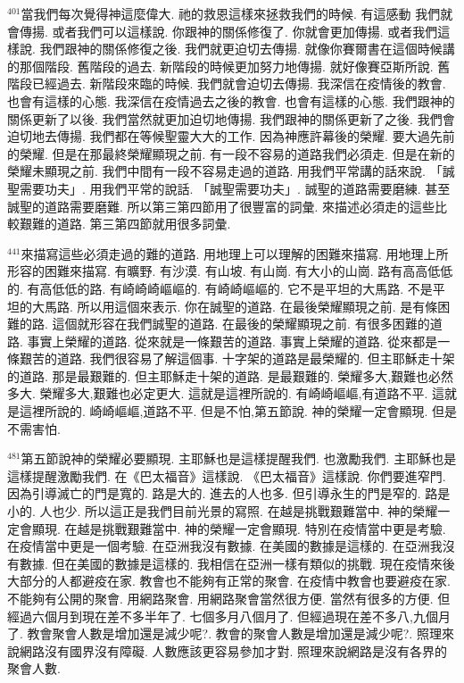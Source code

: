 \documentclass{book}
\begin{document}
$^{401}$當我們每次覺得神這麼偉大.
祂的救恩這樣來拯救我們的時候.
有這感動 我們就會傳揚.
或者我們可以這樣說.
你跟神的關係修復了.
你就會更加傳揚.
或者我們這樣說.
我們跟神的關係修復之後.
我們就更迫切去傳揚.
就像你賽爾書在這個時候講的那個階段.
舊階段的過去.
新階段的時候更加努力地傳揚.
就好像賽亞斯所說.
舊階段已經過去.
新階段來臨的時候.
我們就會迫切去傳揚.
我深信在疫情後的教會.
也會有這樣的心態.
我深信在疫情過去之後的教會.
也會有這樣的心態.
我們跟神的關係更新了以後.
我們當然就更加迫切地傳揚.
我們跟神的關係更新了之後.
我們會迫切地去傳揚.
我們都在等候聖靈大大的工作.
因為神應許幕後的榮耀.
要大過先前的榮耀.
但是在那最終榮耀顯現之前.
有一段不容易的道路我們必須走.
但是在新的榮耀未顯現之前.
我們中間有一段不容易走過的道路.
用我們平常講的話來說.
「誠聖需要功夫」.
用我們平常的說話.
「誠聖需要功夫」.
誠聖的道路需要磨練.
甚至誠聖的道路需要磨難.
所以第三第四節用了很豐富的詞彙.
來描述必須走的這些比較艱難的道路.
第三第四節就用很多詞彙.

$^{441}$來描寫這些必須走過的難的道路.
用地理上可以理解的困難來描寫.
用地理上所形容的困難來描寫.
有曠野.
有沙漠.
有山坡.
有山崗.
有大小的山崗.
路有高高低低的.
有高低低的路.
有崎崎崎嶇嶇的.
有崎崎嶇嶇的.
它不是平坦的大馬路.
不是平坦的大馬路.
所以用這個來表示.
你在誠聖的道路.
在最後榮耀顯現之前.
是有條困難的路.
這個就形容在我們誠聖的道路.
在最後的榮耀顯現之前.
有很多困難的道路.
事實上榮耀的道路.
從來就是一條艱苦的道路.
事實上榮耀的道路.
從來都是一條艱苦的道路.
我們很容易了解這個事.
十字架的道路是最榮耀的.
但主耶穌走十架的道路.
那是最艱難的.
但主耶穌走十架的道路.
是最艱難的.
榮耀多大,艱難也必然多大.
榮耀多大,艱難也必定更大.
這就是這裡所說的.
有崎崎嶇嶇,有道路不平.
這就是這裡所說的.
崎崎嶇嶇,道路不平.
但是不怕,第五節說.
神的榮耀一定會顯現.
但是不需害怕.

$^{481}$第五節說神的榮耀必要顯現.
主耶穌也是這樣提醒我們.
也激勵我們.
主耶穌也是這樣提醒激勵我們.
在《巴太福音》這樣說.
《巴太福音》這樣說.
你們要進窄門.
因為引導滅亡的門是寬的.
路是大的.
進去的人也多.
但引導永生的門是窄的.
路是小的.
人也少.
所以這正是我們目前光景的寫照.
在越是挑戰艱難當中.
神的榮耀一定會顯現.
在越是挑戰艱難當中.
神的榮耀一定會顯現.
特別在疫情當中更是考驗.
在疫情當中更是一個考驗.
在亞洲我沒有數據.
在美國的數據是這樣的.
在亞洲我沒有數據.
但在美國的數據是這樣的.
我相信在亞洲一樣有類似的挑戰.
現在疫情來後大部分的人都避疫在家.
教會也不能夠有正常的聚會.
在疫情中教會也要避疫在家.
不能夠有公開的聚會.
用網路聚會.
用網路聚會當然很方便.
當然有很多的方便.
但經過六個月到現在差不多半年了.
七個多月八個月了.
但經過現在差不多八,九個月了.
教會聚會人數是增加還是減少呢?.
教會的聚會人數是增加還是減少呢?.
照理來說網路沒有國界沒有障礙.
人數應該更容易參加才對.
照理來說網路是沒有各界的聚會人數.
\end{document}
